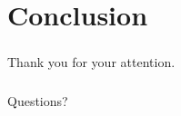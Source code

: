 \documentclass[18pt, xcolor=table]{beamer}
\begin{document}
\section{Conclusion}

\begin{frame}
  \frametitle{}
  \begin{center}
    \huge{Thank you for your attention.}
  \end{center}
\end{frame}

\begin{frame}
  \frametitle{}
  \begin{center}
    \huge{Questions?}
  \end{center}
\end{frame}
\end{document}
